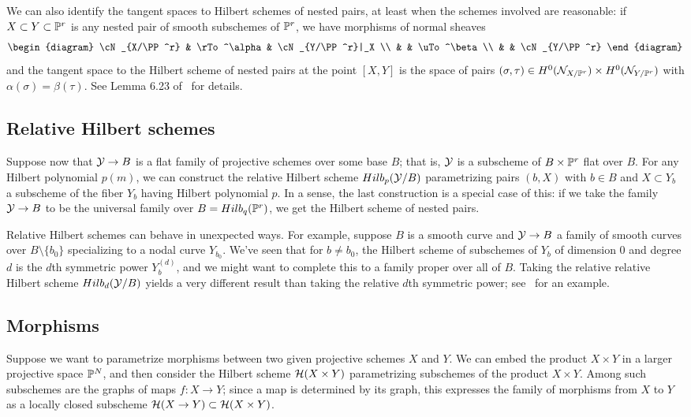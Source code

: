 We can also identify the tangent spaces to Hilbert schemes of nested pairs, at least when the schemes involved are reasonable: if $X \subset Y \subset {\mathbb P}^r$ is any nested pair of smooth subschemes of ${\mathbb P}^r$, we have morphisms of normal sheaves
$$
\begin{diagram}
\cN_{X/\PP^r} & \rTo^\alpha & \cN_{Y/\PP^r}|_X \\
& & \uTo^\beta \\
& & \cN_{Y/\PP^r}
\end{diagram}
$$
and the tangent space to the Hilbert scheme of nested pairs at the point $[X,Y]$ is the space of pairs $(\sigma, \tau) \in H^0({\mathcal N}_{X/{\mathbb P}^r}) \times H^0({\mathcal N}_{Y/{\mathbb P}^r})$ with $\alpha(\sigma) = \beta(\tau)$. See Lemma 6.23 of~\cite{3264} for details.

\subsection{Relative Hilbert schemes}\label{Relative Hilbert schemes} Suppose now that ${\mathcal Y} \to B$ is a flat family of projective schemes over some base $B$; that is, ${\mathcal Y}$ is a subscheme of $B \times {\mathbb P}^r$ flat over $B$. For any Hilbert polynomial $p(m)$, we can construct the relative Hilbert scheme $Hilb_p({\mathcal Y}/B)$ parametrizing pairs $(b, X)$ with $b \in B$ and $X \subset Y_b$ a subscheme of the fiber $Y_b$ having Hilbert polynomial $p$. In a sense, the last construction is a special case of this: if we take the family ${\mathcal Y} \to B$ to be the universal family over $B = Hilb_q({\mathbb P}^r)$, we get the Hilbert scheme of nested pairs.

Relative Hilbert schemes can behave in unexpected ways. For example, suppose $B$ is a smooth curve and ${\mathcal Y} \to B$ a family of smooth curves over $B \setminus \{b_0\}$ specializing to a nodal curve $Y_{b_0}$. We've seen that for $b \neq b_0$, the Hilbert scheme of subschemes of $Y_b$ of dimension 0 and degree $d$ is the $d$th symmetric power $Y_b^{(d)}$, and we might want to complete this to a family proper over all of $B$. Taking the relative relative Hilbert scheme $Hilb_d({\mathcal Y}/B)$ yields a very different result than taking the relative $d$th symmetric power; see~\cite{MR2172162} for an example.


\subsection{Morphisms}\label{Hilbert morphisms} Suppose we want to parametrize morphisms between two given projective schemes $X$ and $Y$. We can embed the product $X \times Y$ in a larger projective space ${\mathbb P}^N$, and then consider the Hilbert scheme $\mathcal H(X \times Y)$ parametrizing subschemes of the product $X \times Y$. Among such subschemes are the graphs of maps $f: X \to Y$; since a map is determined by its graph, this expresses the family of morphisms from $X$ to $Y$ as a locally closed subscheme $\mathcal H(X \to Y) \subset \mathcal H(X \times Y)$.

